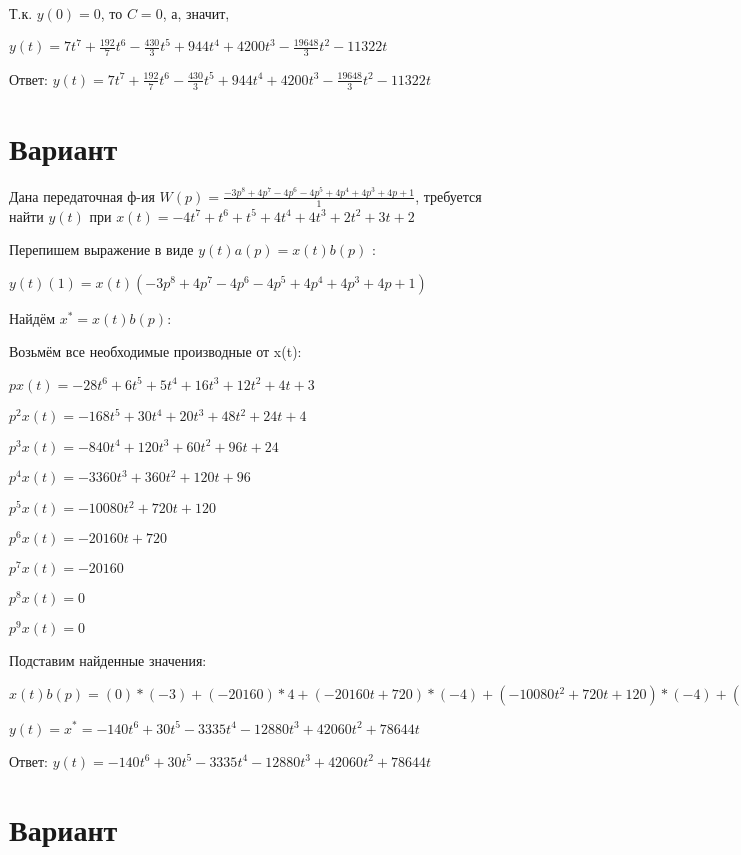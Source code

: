 \documentclass{article}
\begin{document}
{{{Т.к. $y(0)=0$, то $C=0$, а, значит, 

$y(t)=7t^{7}+\frac{192}{7}t^{6}-\frac{430}{3}t^{5}+944t^{4}+4200t^{3}-\frac{19648}{3}t^{2}-11322t$

Ответ: $y(t) = 7t^{7}+\frac{192}{7}t^{6}-\frac{430}{3}t^{5}+944t^{4}+4200t^{3}-\frac{19648}{3}t^{2}-11322t$

\section{Вариант}

Дана передаточная ф-ия $W(p)=\frac{-3p^{8}+4p^{7}-4p^{6}-4p^{5}+4p^{4}+4p^{3}+4p+1}{1}$, требуется найти $y(t)$ при $x(t)=-4t^{7}+t^{6}+t^{5}+4t^{4}+4t^{3}+2t^{2}+3t+2$

Перепишем выражение в виде $y(t)a(p)=x(t)b(p)$ :

$y(t)(1)=x(t)(-3p^{8}+4p^{7}-4p^{6}-4p^{5}+4p^{4}+4p^{3}+4p+1)$

Найдём $x^*=x(t)b(p)$:

Возьмём все необходимые производные от x(t):

$px(t)=-28t^{6}+6t^{5}+5t^{4}+16t^{3}+12t^{2}+4t+3$

$p^2x(t)=-168t^{5}+30t^{4}+20t^{3}+48t^{2}+24t+4$

$p^3x(t)=-840t^{4}+120t^{3}+60t^{2}+96t+24$

$p^4x(t)=-3360t^{3}+360t^{2}+120t+96$

$p^5x(t)=-10080t^{2}+720t+120$

$p^6x(t)=-20160t+720$

$p^7x(t)=-20160$

$p^8x(t)=0$

$p^9x(t)=0$

Подставим найденные значения:

$x(t)b(p) = (0)*(-3)+(-20160)*4+(-20160t+720)*(-4)+(-10080t^{2}+720t+120)*(-4)+(-3360t^{3}+360t^{2}+120t+96)*4+(-840t^{4}+120t^{3}+60t^{2}+96t+24)*4+(-28t^{6}+6t^{5}+5t^{4}+16t^{3}+12t^{2}+4t+3)*4+(-28t^{6}+6t^{5}+5t^{4}+16t^{3}+12t^{2}+4t+3)*1=-140t^{6}+30t^{5}-3335t^{4}-12880t^{3}+42060t^{2}+78644t$





$y(t)=x^*=-140t^{6}+30t^{5}-3335t^{4}-12880t^{3}+42060t^{2}+78644t$

Ответ: $y(t) = -140t^{6}+30t^{5}-3335t^{4}-12880t^{3}+42060t^{2}+78644t$

\section{Вариант}

}}}
\end{document}
